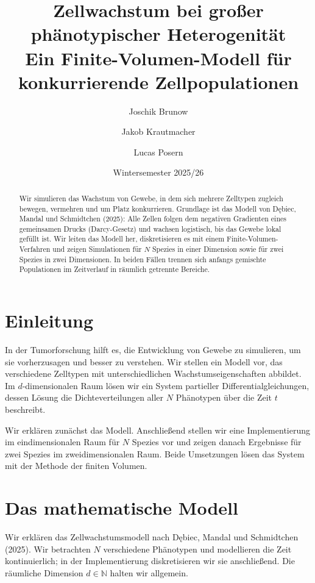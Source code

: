 \documentclass[11pt]{article}
\title{Zellwachstum bei großer phänotypischer Heterogenität\\
\large Ein Finite-Volumen-Modell für konkurrierende Zellpopulationen}
\author{Joschik Brunow \and Jakob Krautmacher \and Lucas Posern}
\date{Wintersemester 2025/26}
\begin{document}
\maketitle

\begin{abstract}
\noindent
Wir simulieren das Wachstum von Gewebe, in dem sich mehrere Zelltypen zugleich
bewegen, vermehren und um Platz konkurrieren. Grundlage ist das Modell von
Dębiec, Mandal und Schmidtchen (2025): Alle Zellen folgen dem negativen
Gradienten eines gemeinsamen Drucks (Darcy-Gesetz) und wachsen logistisch, bis
das Gewebe lokal gefüllt ist. Wir leiten das Modell her, diskretisieren es mit
einem Finite-Volumen-Verfahren und zeigen Simulationen für $N$ Spezies in einer
Dimension sowie für zwei Spezies in zwei Dimensionen. In beiden Fällen trennen
sich anfangs gemischte Populationen im Zeitverlauf in räumlich getrennte
Bereiche.
\end{abstract}

\tableofcontents

\section{Einleitung}
In der Tumorforschung hilft es, die Entwicklung von Gewebe zu simulieren, um sie
vorherzusagen und besser zu verstehen. Wir stellen ein Modell vor, das
verschiedene Zelltypen mit unterschiedlichen Wachstumseigenschaften abbildet. Im
$d$-dimensionalen Raum lösen wir ein System partieller Differentialgleichungen,
dessen Lösung die Dichteverteilungen aller $N$ Phänotypen über die Zeit $t$
beschreibt.

Wir erklären zunächst das Modell. Anschließend stellen wir eine Implementierung
im eindimensionalen Raum für $N$ Spezies vor und zeigen danach Ergebnisse für
zwei Spezies im zweidimensionalen Raum. Beide Umsetzungen lösen das System mit
der Methode der finiten Volumen.

\section{Das mathematische Modell}
\label{sec:modell}
Wir erklären das Zellwachstumsmodell nach Dębiec, Mandal und Schmidtchen (2025).
Wir betrachten $N$ verschiedene Phänotypen und modellieren die Zeit kontinuierlich;
in der Implementierung diskretisieren wir sie anschließend. Die räumliche
Dimension $d \in \mathbb{N}$ halten wir allgemein.
\end{document}
